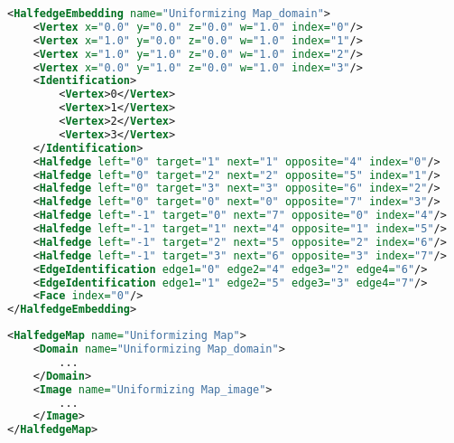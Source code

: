 \documentclass[Thesis.tex]{subfiles}
\begin{document}
\begin{lstlisting}[label=lst:hyperelliptic_xml, caption={A torus given as {\tt HalfedegeEmbedding}
with identified edge pairs and vertices.}, numbers=none, language=XML, captionpos=b]
<HalfedgeEmbedding name="Uniformizing Map_domain">
	<Vertex x="0.0" y="0.0" z="0.0" w="1.0" index="0"/>
	<Vertex x="1.0" y="0.0" z="0.0" w="1.0" index="1"/>
	<Vertex x="1.0" y="1.0" z="0.0" w="1.0" index="2"/>
	<Vertex x="0.0" y="1.0" z="0.0" w="1.0" index="3"/>
	<Identification>
		<Vertex>0</Vertex>
		<Vertex>1</Vertex>
		<Vertex>2</Vertex>
		<Vertex>3</Vertex>
	</Identification>
	<Halfedge left="0" target="1" next="1" opposite="4" index="0"/>
	<Halfedge left="0" target="2" next="2" opposite="5" index="1"/>
	<Halfedge left="0" target="3" next="3" opposite="6" index="2"/>
	<Halfedge left="0" target="0" next="0" opposite="7" index="3"/>
	<Halfedge left="-1" target="0" next="7" opposite="0" index="4"/>
	<Halfedge left="-1" target="1" next="4" opposite="1" index="5"/>
	<Halfedge left="-1" target="2" next="5" opposite="2" index="6"/>
	<Halfedge left="-1" target="3" next="6" opposite="3" index="7"/>
	<EdgeIdentification edge1="0" edge2="4" edge3="2" edge4="6"/>
	<EdgeIdentification edge1="1" edge2="5" edge3="3" edge4="7"/>
	<Face index="0"/>
</HalfedgeEmbedding>
\end{lstlisting}

\begin{lstlisting}[label=lst:hyperelliptic_xml, caption={A discrete map is given by a pair of embeddings, the {\tt Domain} and {\tt Image} of the map. Both are of type {\tt HalfedgeEmbedding}.}, numbers=none, language=XML, captionpos=b]
<HalfedgeMap name="Uniformizing Map">
	<Domain name="Uniformizing Map_domain">
		...
	</Domain>
	<Image name="Uniformizing Map_image">
		...
	</Image>
</HalfedgeMap>
\end{lstlisting}
\end{document}
